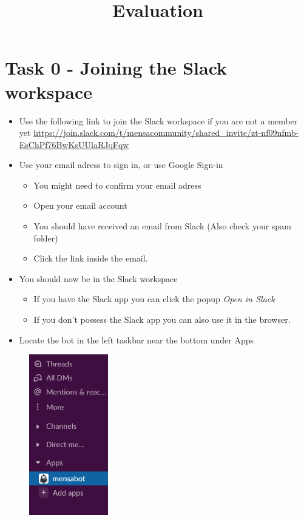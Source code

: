 


\title{Evaluation}



\maketitle

\section*{Task 0 - Joining the Slack workspace}
    
     
\begin{itemize}
    \item Use the following link
    to join the Slack workspace if you are not a member yet
    \url{https://join.slack.com/t/mensacommunity/shared_invite/zt-nf09nfmb-EsChPf76BwKsUUlaRJqFqw}
    \item Use your email adress to sign in, or use Google Sign-in
    \begin{itemize}
    \item You might need to confirm your email adress
    \item Open your email account
    \item You should have received an email from Slack (Also check your spam folder)
    \item  Click the link inside the email. 
    \end{itemize}
    \item You should now be  in the Slack workspace
    \begin{itemize}
        \item If you have the Slack app you can click the popup \emph{Open in Slack}
        \item If you don't possess the Slack app you can also use it in the browser.
    \end{itemize}
    \item Locate the bot in the left taskbar near the bottom under Apps
\end{itemize}

\begin{figure}[h]
    \centering
    \includegraphics[height=7cm]{bot.png}
\end{figure}

